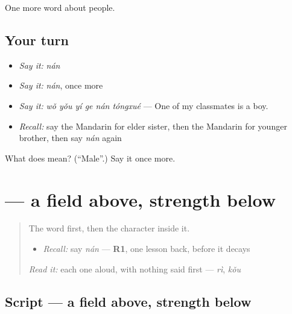 \begin{grammarlens}[title={What you've built}]
One more word about people.
\end{grammarlens}

\subsection*{Your turn}
\begin{itemize}
\raggedright
  \item \emph{Say it:} \emph{nán}
  \item \emph{Say it:} \emph{nán}, once more
  \item \emph{Say it:} \emph{wǒ yǒu yí ge nán tóngxué} — One of my classmates is a boy.
  \item \emph{Recall:} say the Mandarin for elder sister, then the Mandarin for younger brother, then say \emph{nán} again
\end{itemize}

\begin{tcolorbox}[breakable,colback=teal!4,colframe=teal!35!black,title={Before you move on}]
What does  mean? (\textquotedblleft{}Male\textquotedblright{}.) Say it once more.
\end{tcolorbox}
\section[\texorpdfstring{\zh{男} (nán)}{男 (nán)}]{ — a field above, strength below}

\label{lesson:ZH-W33-nan}



\begin{quote}
The word first, then the character inside it.

\begin{itemize}
\raggedright
  \item \emph{Recall:} say \emph{nán} — \textbf{R1}, one lesson back, before it decays
\end{itemize}

\begin{quote}
 
\end{quote}

\emph{Read it:} each one aloud, with nothing said first — \emph{rì}, \emph{kǒu}
\end{quote}

\subsection*{Script — a field above, strength below}


